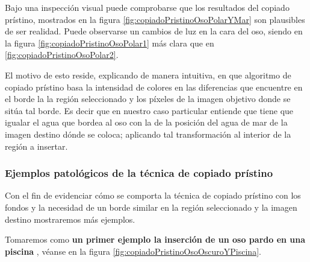 \documentclass[11pt,twoside,titlepage,a4paper]{article}
\numberwithin{equation}{section} %
\theoremstyle{usual}
\begin{document}
Bajo una inspección visual puede comprobarse que los resultados del copiado prístino, mostrados en la figura \ref{fig:copiadoPristinoOsoPolarYMar} son plausibles de ser realidad. Puede observarse un cambios de luz en la cara del oso, siendo en la figura \ref{fig:copiadoPristinoOsoPolar1} más clara que  en  \ref{fig:copiadoPristinoOsoPolar2}.  

El motivo de esto reside, explicando de manera intuitiva, en que  algoritmo de copiado prístino basa
la intensidad de colores en las diferencias que encuentre en el borde la la región seleccionado y los píxeles de la imagen objetivo donde se sitúa tal borde.  
Es decir que en nuestro caso particular entiende que tiene que igualar el agua que bordea al oso con la de la posición del agua de mar de la imagen destino dónde se coloca; aplicando tal transformación al interior de la región a insertar.

\subsubsection{Ejemplos patológicos de la técnica de copiado prístino}
\label{SectionEjemploPatologicos}
Con el fin de evidenciar cómo se comporta la técnica de copiado prístino con los fondos y la necesidad de un borde similar en la región seleccionado y la imagen destino mostraremos más ejemplos. 

Tomaremos como \textbf{un primer ejemplo la inserción de un oso pardo en una piscina }, véanse en la figura  \ref{fig:copiadoPristinoOsoOscuroYPiscina}. 
\end{document}
